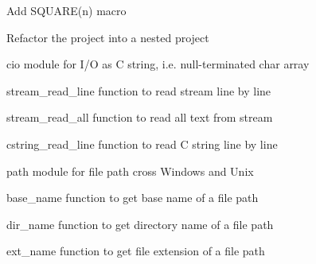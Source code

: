 
\begin{DoxyItemize}
\item Add {\ttfamily S\+Q\+U\+A\+R\+E(n)} macro
\item Refactor the project into a nested project
\item {\ttfamily cio} module for I/O as C string, i.\+e. null-\/terminated {\ttfamily char} array
\begin{DoxyItemize}
\item {\ttfamily stream\+\_\+read\+\_\+line} function to read stream line by line
\item {\ttfamily stream\+\_\+read\+\_\+all} function to read all text from stream
\item {\ttfamily cstring\+\_\+read\+\_\+line} function to read C string line by line
\end{DoxyItemize}
\item {\ttfamily path} module for file path cross Windows and Unix
\begin{DoxyItemize}
\item {\ttfamily base\+\_\+name} function to get base name of a file path
\item {\ttfamily dir\+\_\+name} function to get directory name of a file path
\item {\ttfamily ext\+\_\+name} function to get file extension of a file path 
\end{DoxyItemize}
\end{DoxyItemize}